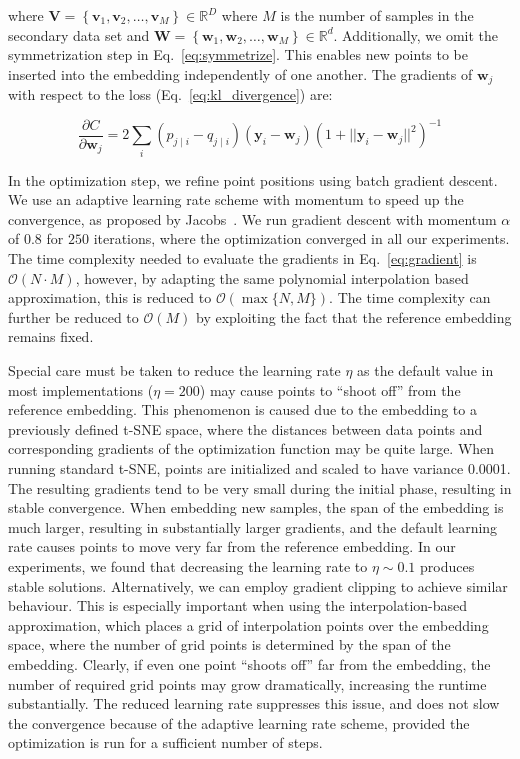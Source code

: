 \documentclass[runningheads]{llncs}
\begin{document}
\noindent where $\mathbf{V} = \left \{ \mathbf{v}_1, \mathbf{v}_2, \dots,
\mathbf{v}_M \right \} \in \mathbb{R}^D$ where $M$ is the number of samples in
the secondary data set and $\mathbf{W} = \left \{ \mathbf{w}_1, \mathbf{w}_2, \dots,
\mathbf{w}_M \right \} \in \mathbb{R}^d$. Additionally, we omit the
symmetrization step in Eq.~\ref{eq:symmetrize}. This enables new points to be
inserted into the embedding independently of one another. The gradients of
$\mathbf{w}_j$ with respect to the loss (Eq.~\ref{eq:kl_divergence}) are:

\begin{equation}
\frac{\partial C}{\partial \mathbf{w}_j} = 2 \sum_i \left ( p_{j \mid i} - q_{j \mid i} \right ) \left ( \mathbf{y}_i - \mathbf{w}_j \right ) \left ( 1 + || \mathbf{y}_i - \mathbf{w}_j || ^2 \right )^{-1}
\label{eq:gradient}
\end{equation}

In the optimization step, we refine point positions using batch gradient
descent. We use an adaptive learning rate scheme with momentum to speed up the
convergence, as proposed by Jacobs~\cite{Jacobs1988,Maaten2014}. We run gradient
descent with momentum $\alpha$ of $0.8$ for $250$ iterations, where the
optimization converged in all our experiments. The time complexity needed to
evaluate the gradients in Eq.~\ref{eq:gradient} is $\mathcal{O}(N \cdot M)$,
however, by adapting the same polynomial interpolation based approximation, this
is reduced to $\mathcal{O}(\max \{ N, M \})$. The time complexity can further be
reduced to $\mathcal{O}(M)$ by exploiting the fact that the reference embedding
remains fixed.

Special care must be taken to reduce the learning rate $\eta$ as the default
value in most implementations ($\eta = 200$) may cause points to ``shoot off''
from the reference embedding. This phenomenon is caused due to the embedding to
a previously defined t-SNE space, where the distances between data points and
corresponding gradients of the optimization function may be quite large. When
running standard t-SNE, points are initialized and scaled to have variance
0.0001. The resulting gradients tend to be very small during the initial phase,
resulting in stable convergence. When embedding new samples, the span of the
embedding is much larger, resulting in substantially larger gradients, and the
default learning rate causes points to move very far from the reference
embedding. In our experiments, we found that decreasing the learning rate to
$\eta \sim 0.1$ produces stable solutions. Alternatively, we can employ gradient
clipping to achieve similar behaviour. This is especially important when using
the interpolation-based approximation, which places a grid of interpolation
points over the embedding space, where the number of grid points is determined
by the span of the embedding. Clearly, if even one point ``shoots off'' far from
the embedding, the number of required grid points may grow dramatically,
increasing the runtime substantially. The reduced learning rate suppresses this
issue, and does not slow the convergence because of the adaptive learning rate
scheme, provided the optimization is run for a sufficient number of steps.
\end{document}
